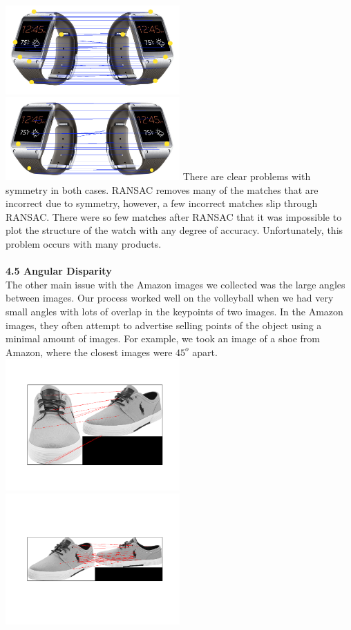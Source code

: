 \documentclass[12pt]{article}
\begin{document}
\begin{multicols}{2}
\includegraphics[width=0.5\textwidth]{images/watch_symmetry_before_ransac.png}
\includegraphics[width=0.5\textwidth]{images/watch_symmetry.png} 
There are clear problems with symmetry in both cases. RANSAC removes many of the matches that are incorrect due to symmetry, however, a few incorrect matches slip through RANSAC. There were so few matches after RANSAC that it was impossible to plot the structure of the watch with any degree of accuracy. Unfortunately, this problem occurs with many products.\\\\
{\large \textbf{4.5 Angular Disparity}}\\
The other main issue with the Amazon images we collected was the large angles between images. Our process worked well on the volleyball when we had very small angles with lots of overlap in the keypoints of two images. In the Amazon images, they often attempt to advertise selling points of the object using a minimal amount of images. For example, we took an image of a shoe from Amazon, where the closest images were $45^o$ apart.\\
\includegraphics[width=0.5\textwidth]{images/ShoeFrontAngle.png} 
\includegraphics[width=0.5\textwidth]{images/ShoeAngleLeft.png} 

\end{multicols}
\end{document}
